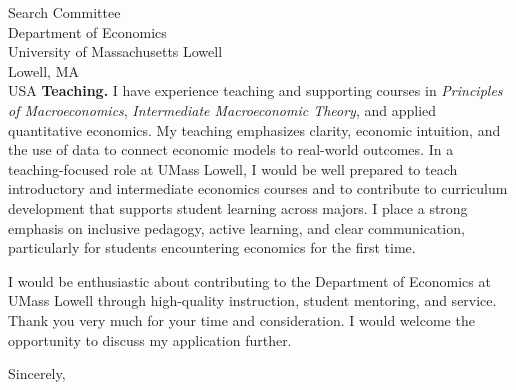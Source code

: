 \documentclass[11pt,letterpaper]{letter}
\begin{document}
\begin{letter}{Search Committee \\
Department of Economics \\
University of Massachusetts Lowell \\
Lowell, MA \\ USA}
\textbf{Teaching.} I have experience teaching and supporting courses in \textit{Principles of Macroeconomics}, \textit{Intermediate Macroeconomic Theory}, and applied quantitative economics. My teaching emphasizes clarity, economic intuition, and the use of data to connect economic models to real-world outcomes. In a teaching-focused role at UMass Lowell, I would be well prepared to teach introductory and intermediate economics courses and to contribute to curriculum development that supports student learning across majors. I place a strong emphasis on inclusive pedagogy, active learning, and clear communication, particularly for students encountering economics for the first time.

I would be enthusiastic about contributing to the Department of Economics at UMass Lowell through high-quality instruction, student mentoring, and service. Thank you very much for your time and consideration. I would welcome the opportunity to discuss my application further.

\closing{Sincerely,}

\end{letter}
\end{document}

